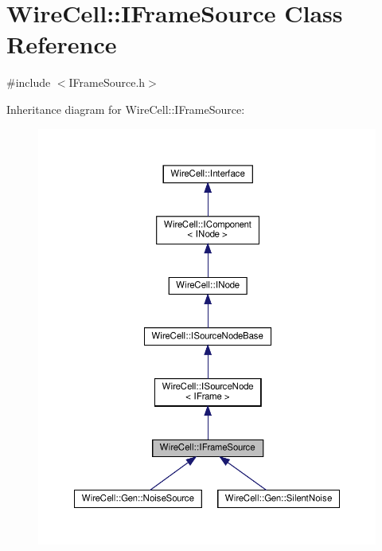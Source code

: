 \hypertarget{class_wire_cell_1_1_i_frame_source}{}\section{Wire\+Cell\+:\+:I\+Frame\+Source Class Reference}
\label{class_wire_cell_1_1_i_frame_source}


{\ttfamily \#include $<$I\+Frame\+Source.\+h$>$}



Inheritance diagram for Wire\+Cell\+:\+:I\+Frame\+Source\+:
\nopagebreak
\begin{figure}[H]
\begin{center}
\leavevmode
\includegraphics[width=350pt]{class_wire_cell_1_1_i_frame_source__inherit__graph}
\end{center}
\end{figure}


